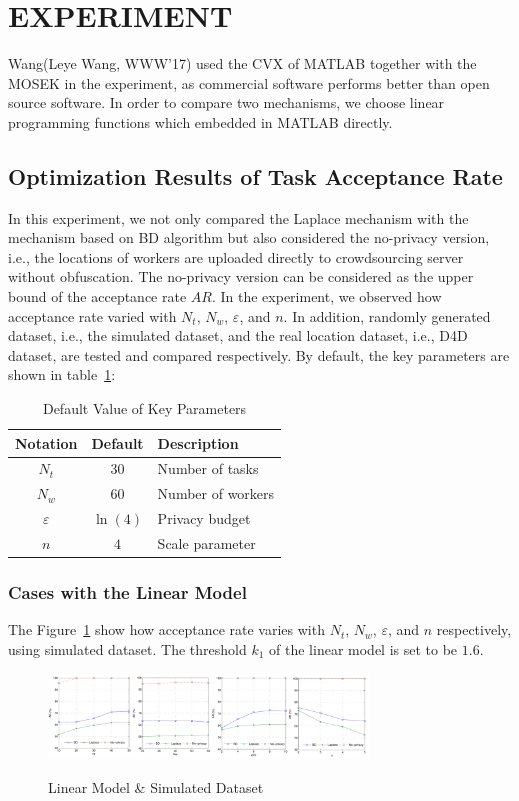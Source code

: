 \section{EXPERIMENT}
Wang(Leye Wang, WWW’17) used the CVX of MATLAB together with the MOSEK in the experiment, as commercial software performs better than open source software. In order to compare two mechanisms, we choose linear programming functions which embedded in MATLAB directly.

\subsection{Optimization Results of Task Acceptance Rate}
In this experiment, we not only compared the Laplace mechanism with the mechanism based on BD algorithm but also considered the no-privacy version, i.e., the locations of workers are uploaded directly to crowdsourcing server without obfuscation. The no-privacy version can be considered as the upper bound of the acceptance rate $AR$. In the experiment, we observed how acceptance rate varied with $N_t$, $N_w$, $\varepsilon$, and $n$. In addition, randomly generated dataset, i.e., the simulated dataset, and the real location dataset, i.e., D4D dataset, are tested and compared respectively. By default, the key parameters are shown in table~\ref{tab:deft}:
\begin{table}
  \caption{Default Value of Key Parameters}
  \label{tab:deft}
  \begin{tabular}{ccl}
    \toprule
    Notation & Default & Description\\
    \midrule
    $N_t$ & $30$ & Number of tasks\\
    $N_w$ & $60$ & Number of workers\\
    $\varepsilon$ & $\ln (4)$ & Privacy budget\\
    $n$ & $4$ & Scale parameter\\
  \bottomrule
\end{tabular}
\end{table}

\subsubsection{Cases with the Linear Model}
The Figure~\ref{img:LinSim} show how acceptance rate varies with $N_t$, $N_w$, $\varepsilon$, and $n$ respectively, using simulated dataset. The threshold $k_1$ of the linear model is set to be $1.6$.

\begin{figure}
\includegraphics[width=8.5cm]{LinSim}
\label{img:LinSim}
\caption{Linear Model \& Simulated Dataset}
\end{figure}

